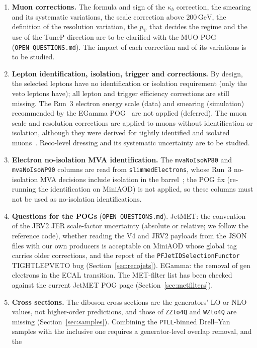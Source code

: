 \documentclass[11pt]{article}
\newcommand{\pt}{p_{\mathrm{T}}}
\newcommand{\GeV}{\ensuremath{\,\mathrm{GeV}}}
\newcommand{\code}[1]{\texttt{#1}}
\begin{document}
\begin{enumerate}
  variations are enabled. The required steps are listed in \code{simulation/backToBack\_plan.md}.
\item \textbf{Muon corrections.} The formula and sign of the $\kappa_b$ correction, the smearing and its systematic
  variations, the scale correction above $200\GeV$, the definition of the resolution variation, the $\pt$ that decides
  the regime and the use of the TuneP direction are to be clarified with the MUO POG (\code{OPEN\_QUESTIONS.md}). The
  impact of each correction and of its variations is to be studied.
\item \textbf{Lepton identification, isolation, trigger and corrections.} By design, the selected leptons have no
  identification or isolation requirement (only the veto leptons have); all lepton and trigger efficiency corrections
  are still missing. The Run~3 electron energy scale (data) and smearing
  (simulation) recommended by the EGamma POG~\cite{EGMsas} are not applied (deferred). The muon scale and resolution
  corrections are applied to muons without identification or isolation, although they were derived for tightly
  identified and isolated muons~\cite{MUOscare}. Reco-level dressing and its systematic uncertainty are to be studied.
\item \textbf{Electron no-isolation MVA identification.} The \code{mvaNoIsoWP80} and \code{mvaNoIsoWP90} columns are
  read from \code{slimmedElectrons}, whose Run~3 no-isolation MVA decisions include isolation in the
  barrel~\cite{EGMmvaid}; the POG fix (re-running the identification on MiniAOD) is not applied, so these columns must
  not be used as no-isolation identifications.
\item \textbf{Questions for the POGs} (\code{OPEN\_QUESTIONS.md}). JetMET: the convention of the JRV2 JER
  scale-factor uncertainty (absolute or relative; we follow the reference code), whether reading the V4 and JRV2
  payloads from the JSON files with our own producers is acceptable on MiniAOD whose global tag carries older
  corrections, and the report of the \code{PFJetIDSelectionFunctor} TIGHTLEPVETO bug (Section~\ref{sec:recojets}).
  EGamma: the removal of gen electrons in the ECAL transition. The MET-filter list has been checked against the
  current JetMET POG page (Section~\ref{sec:metfilters}).
\item \textbf{Cross sections.} The diboson cross sections are the generators' LO or NLO values, not higher-order
  predictions, and those of \code{ZZto4Q} and \code{WZto4Q} are missing (Section~\ref{sec:samples}). Combining the
  \code{PTLL}-binned Drell--Yan samples with the inclusive one requires a generator-level overlap removal, and the

\end{enumerate}
\end{document}
